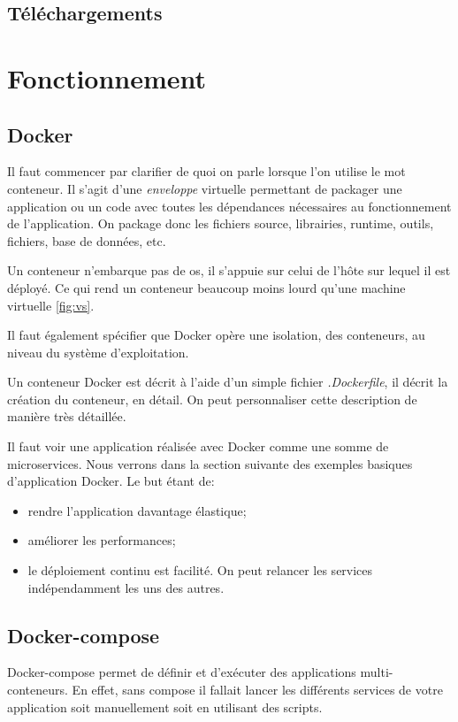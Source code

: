 \subsection{Téléchargements}

\section{Fonctionnement}
\subsection{Docker}
Il faut commencer par clarifier de quoi on parle lorsque l'on utilise le mot conteneur. Il s'agit d'une \emph{enveloppe} virtuelle permettant de packager une application ou un code avec toutes les dépendances nécessaires au fonctionnement de l'application. On package donc les fichiers source, librairies, runtime, outils, fichiers, base de données, etc. 

Un conteneur n'embarque pas de \gls{os}, il s'appuie sur celui de l'hôte sur lequel il est déployé. Ce qui rend un conteneur beaucoup moins lourd qu'une machine virtuelle \ref{fig:vs}.

Il faut également spécifier que Docker opère une isolation, des conteneurs, au niveau du système d'exploitation. 

Un conteneur Docker est décrit à l'aide d'un simple fichier \emph{.Dockerfile}, il décrit la création du conteneur, en détail. On peut personnaliser cette description de manière très détaillée. 

Il faut voir une application réalisée avec Docker comme une somme de microservices. Nous verrons dans la section suivante des exemples basiques d'application Docker. Le but étant de:

\begin{itemize}
\item rendre l'application davantage élastique;
\item améliorer les performances;
\item le déploiement continu est facilité. On peut relancer les services indépendamment les uns des autres.
\end{itemize}


\subsection{Docker-compose}
Docker-compose permet de définir et d'exécuter des applications multi-conteneurs. En effet, sans compose il fallait lancer les différents services de votre application soit manuellement soit en utilisant des scripts.

